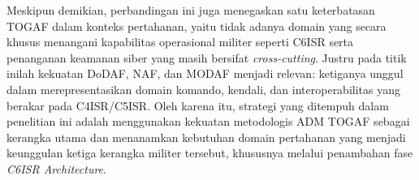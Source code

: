 Meskipun demikian, perbandingan ini juga menegaskan satu keterbatasan TOGAF dalam konteks pertahanan, yaitu tidak adanya domain yang secara khusus menangani kapabilitas operasional militer seperti C6ISR serta penanganan keamanan siber yang masih bersifat \textit{cross-cutting}.
Justru pada titik inilah kekuatan DoDAF, NAF, dan MODAF menjadi relevan: ketiganya unggul dalam merepresentasikan domain komando, kendali, dan interoperabilitas yang berakar pada C4ISR/C5ISR.
Oleh karena itu, strategi yang ditempuh dalam penelitian ini adalah menggunakan kekuatan metodologis ADM TOGAF sebagai kerangka utama dan menanamkan kebutuhan domain pertahanan yang menjadi keunggulan ketiga kerangka militer tersebut, khususnya melalui penambahan fase \textit{C6ISR Architecture}.




























